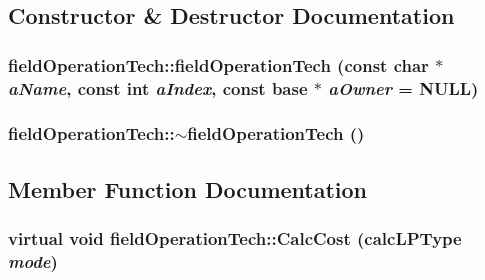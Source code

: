 \subsection{Constructor \& Destructor Documentation}
\hypertarget{classfield_operation_tech_a55967c049d29aae8062f19b6c8541596}{
\subsubsection[{fieldOperationTech}]{\setlength{\rightskip}{0pt plus 5cm}fieldOperationTech::fieldOperationTech (const char $\ast$ {\em aName}, \/  const int {\em aIndex}, \/  const {\bf base} $\ast$ {\em aOwner} = {\ttfamily NULL})}}
\label{classfield_operation_tech_a55967c049d29aae8062f19b6c8541596}
\hypertarget{classfield_operation_tech_a5ba3ad6f9dd43c2b7d740c24a528907a}{
\subsubsection[{$\sim$fieldOperationTech}]{\setlength{\rightskip}{0pt plus 5cm}fieldOperationTech::$\sim$fieldOperationTech ()}}
\label{classfield_operation_tech_a5ba3ad6f9dd43c2b7d740c24a528907a}


\subsection{Member Function Documentation}
\hypertarget{classfield_operation_tech_a908e81a53479de1a6768d58964dbc57c}{
\subsubsection[{CalcCost}]{\setlength{\rightskip}{0pt plus 5cm}virtual void fieldOperationTech::CalcCost ({\bf calcLPType} {\em mode})}}
\label{classfield_operation_tech_a908e81a53479de1a6768d58964dbc57c}


